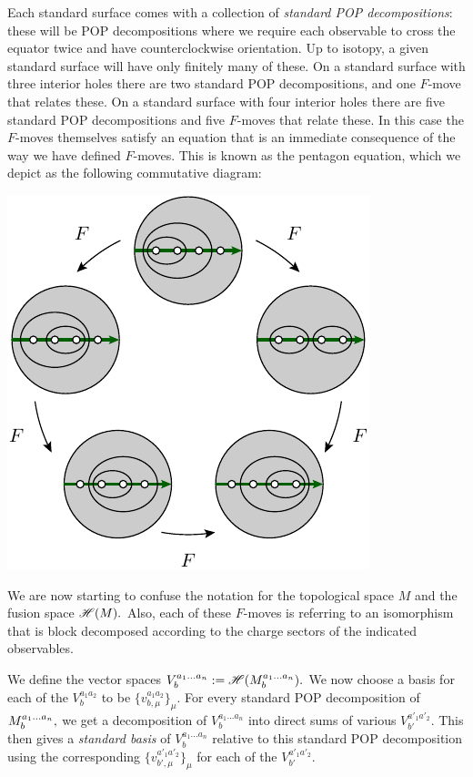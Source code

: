 \documentclass[aps, tightenlines, letterpaper, onecolumn, superscriptaddress, notitlepage, 11pt, groupedaddress]{revtex4-1}
\begin{document}
Each standard surface comes with a collection of
\emph{standard POP decompositions}:
these will be POP decompositions where we require each
observable to cross the
equator twice and have counterclockwise orientation.
Up to isotopy, a given standard surface will have only finitely many of these.
On a standard surface with three
interior holes there are two standard POP decompositions,
and one $F$-move that relates these.
On a standard surface with four interior holes there are five 
standard POP decompositions and five $F$-moves that relate these.
In this case the $F$-moves themselves satisfy an equation
that is an immediate consequence of the way we have defined $F$-moves.
This is known as the pentagon equation, which we depict as
the following commutative diagram:
\begin{center}
\includegraphics[]{pic-pentagon.pdf}
\end{center}
We are now starting to confuse the notation 
for the topological space $M$ and the fusion space $\mathscr{H}(M).$
Also, each of these $F$-moves is referring to an isomorphism 
that is block decomposed according to the charge sectors 
of the indicated observables.

We define the vector spaces 
$ V^{a_1...a_n}_{b} := \mathscr{H}(M^{a_1...a_n}_{b}).$ 
We now choose a basis for each of the
$V^{a_1a_2}_{b}$ to be $\{v^{a_1a_2}_{b,\mu}\}_{\mu}.$
For every standard POP decomposition of $M^{a_1...a_n}_{b},$
we get a decomposition of 
$V^{a_1...a_n}_{b}$ into direct sums of various %
$V^{a'_1a'_2}_{b'}.$ 
This then gives a \emph{standard basis} of $V^{a_1...a_n}_{b}$
relative to this standard POP decomposition
using the corresponding  $\{v^{a'_1a'_2}_{b',\mu}\}_{\mu}$
for each of the $V^{a'_1a'_2}_{b'}.$ %
\end{document}
